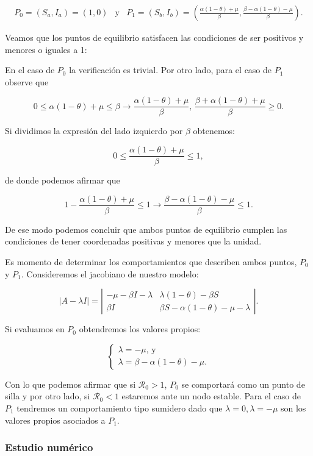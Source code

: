 $$\begin{array}{ccc}
    P_0=(S_a,I_a)=(1,0) & \text{y} & P_1=(S_b,I_b)=\left(\frac{\alpha(1-\theta)+\mu}{\beta},\frac{\beta-\alpha(1-\theta)-\mu}{\beta}\right).
\end{array}$$

Veamos que los puntos de equilibrio satisfacen las condiciones de ser positivos y menores o iguales a 1:

En el caso de $P_0$ la verificación es trivial. Por otro lado, para el caso de $P_1$ observe que 

$$0\leq\alpha(1-\theta)+\mu\leq\beta \longrightarrow \frac{\alpha(1-\theta)+\mu}{\beta}\text{, }\frac{\beta+\alpha(1-\theta)+\mu}{\beta}\geq0.$$

Si dividimos la expresión del lado izquierdo por $\beta$ obtenemos:

$$0\leq \frac{\alpha(1-\theta)+\mu}{\beta}\leq1,$$

de donde podemos afirmar que 

$$1-\frac{\alpha(1-\theta)+\mu}{\beta}\leq1 \longrightarrow \frac{\beta-\alpha(1-\theta)-\mu}{\beta}\leq1.$$

De ese modo podemos concluir que ambos puntos de equilibrio cumplen las condiciones de tener coordenadas positivas y menores que la unidad.

Es momento de determinar los comportamientos que describen ambos puntos, $P_0$ y $P_1$. Consideremos el jacobiano de nuestro modelo:

$$|A-\lambda I|=
\left|\begin{array}{cc}
-\mu-\beta I-\lambda & \lambda(1-\theta)-\beta S \\
\beta I & \beta S-\alpha(1-\theta)-\mu-\lambda
\end{array}\right|.$$

Si evaluamos en $P_0$ obtendremos los valores propios:

$$\left\{\begin{array}{l}\lambda=-\mu\text{, y}\\
\lambda=\beta-\alpha(1-\theta)-\mu.\end{array}\right.$$

Con lo que podemos afirmar que si $\mathcal{R}_0>1$, $P_0$ se comportará como un punto de silla y por otro lado, si $\mathcal{R}_0<1$ estaremos ante un nodo estable. Para el caso de $P_1$ tendremos un comportamiento tipo sumidero dado que $\lambda=0,\lambda=-\mu$ son los valores propios asociados a $P_1$.

\subsubsection{Estudio numérico}

